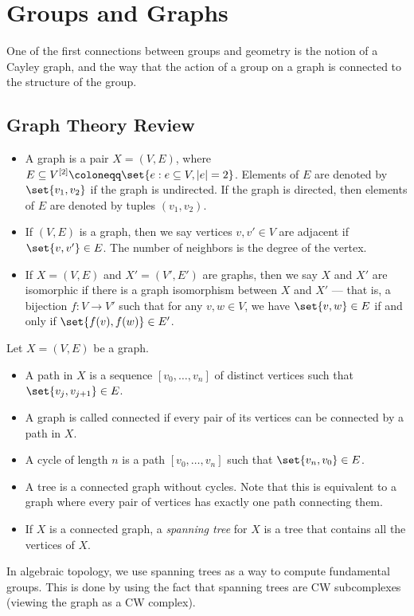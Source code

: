 \documentclass[10pt]{mypackage}
\renewcommand{\coloneq}{\coloneqq}
\begin{document}
\section{Groups and Graphs}%
One of the first connections between groups and geometry is the notion of a Cayley graph, and the way that the action of a group on a graph is connected to the structure of the group.
\subsection{Graph Theory Review}%
\begin{definition}\hfill
  \begin{itemize}
    \item A graph is a pair $X = \left( V,E \right)$, where $E\subseteq V^{[2]} \coloneq \set{e : e\subseteq V,\left\vert e \right\vert = 2}$. Elements of $E$ are denoted by $\set{v_1,v_2}$ if the graph is undirected. If the graph is directed, then elements of $E$ are denoted by tuples $\left( v_1,v_2 \right)$.
    \item If $\left( V,E \right)$ is a graph, then we say vertices $v,v'\in V$ are adjacent if $\set{v,v'}\in E$. The number of neighbors is the degree of the vertex.
    \item If $X = \left( V,E \right)$ and $X' = \left( V',E' \right)$ are graphs, then we say $X$ and $X'$ are isomorphic if there is a graph isomorphism between $X$ and $X'$ --- that is, a bijection $f\colon V\rightarrow V'$ such that for any $v,w\in V$, we have $\set{v,w}\in E$ if and only if $\set{f(v),f(w)}\in E'$.
  \end{itemize}
\end{definition}
\begin{definition}
  Let $X = \left( V,E \right)$ be a graph. 
  \begin{itemize}
    \item A path in $X$ is a sequence $\left[ v_0,\dots,v_n \right]$ of distinct vertices such that $\set{v_j,v_{j+1}}\in E$.
    \item A graph is called connected if every pair of its vertices can be connected by a path in $X$.
    \item A cycle of length $n$ is a path $\left[ v_0,\dots,v_{n} \right]$ such that $\set{v_n,v_0}\in E$.
    \item A tree is a connected graph without cycles. Note that this is equivalent to a graph where every pair of vertices has exactly one path connecting them.
    \item If $X$ is a connected graph, a \textit{spanning tree} for $X$ is a tree that contains all the vertices of $X$.
  \end{itemize}
\end{definition}
In algebraic topology, we use spanning trees as a way to compute fundamental groups. This is done by using the fact that spanning trees are CW subcomplexes (viewing the graph as a CW complex).
\end{document}
